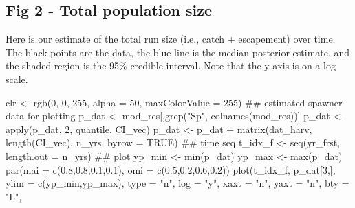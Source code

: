 \documentclass[
  11pt,
]{article}
\newenvironment{Shaded}{}{}
\newcommand{\AttributeTok}[1]{#1}
\newcommand{\ConstantTok}[1]{#1}
\newcommand{\DecValTok}[1]{#1}
\newcommand{\DocumentationTok}[1]{\textcolor[rgb]{0.00,0.50,0.00}{#1}}
\newcommand{\FloatTok}[1]{#1}
\newcommand{\FunctionTok}[1]{#1}
\newcommand{\NormalTok}[1]{#1}
\newcommand{\OtherTok}[1]{\textcolor[rgb]{1.00,0.25,0.00}{#1}}
\newcommand{\SpecialCharTok}[1]{\textcolor[rgb]{0.00,0.50,0.50}{#1}}
\newcommand{\StringTok}[1]{\textcolor[rgb]{0.00,0.50,0.50}{#1}}
\begin{document}
\hypertarget{fig-2---total-population-size}{%
\subsection{Fig 2 - Total population
size}\label{fig-2---total-population-size}}

Here is our estimate of the total run size (i.e., catch + escapement)
over time. The black points are the data, the blue line is the median
posterior estimate, and the shaded region is the 95\% credible interval.
Note that the y-axis is on a log scale.

\begin{Shaded}
\begin{Highlighting}[]
\NormalTok{clr }\OtherTok{\textless{}{-}} \FunctionTok{rgb}\NormalTok{(}\DecValTok{0}\NormalTok{, }\DecValTok{0}\NormalTok{, }\DecValTok{255}\NormalTok{, }\AttributeTok{alpha =} \DecValTok{50}\NormalTok{, }\AttributeTok{maxColorValue =} \DecValTok{255}\NormalTok{)}
\DocumentationTok{\#\# estimated spawner data for plotting}
\NormalTok{p\_dat }\OtherTok{\textless{}{-}}\NormalTok{ mod\_res[,}\FunctionTok{grep}\NormalTok{(}\StringTok{"Sp"}\NormalTok{, }\FunctionTok{colnames}\NormalTok{(mod\_res))]}
\NormalTok{p\_dat }\OtherTok{\textless{}{-}} \FunctionTok{apply}\NormalTok{(p\_dat, }\DecValTok{2}\NormalTok{, quantile, CI\_vec)}
\NormalTok{p\_dat }\OtherTok{\textless{}{-}}\NormalTok{ p\_dat }\SpecialCharTok{+} \FunctionTok{matrix}\NormalTok{(dat\_harv, }\FunctionTok{length}\NormalTok{(CI\_vec), n\_yrs, }\AttributeTok{byrow =} \ConstantTok{TRUE}\NormalTok{)}
\DocumentationTok{\#\# time seq}
\NormalTok{t\_idx\_f }\OtherTok{\textless{}{-}} \FunctionTok{seq}\NormalTok{(yr\_frst, }\AttributeTok{length.out =}\NormalTok{ n\_yrs)}
\DocumentationTok{\#\# plot}
\NormalTok{yp\_min }\OtherTok{\textless{}{-}} \FunctionTok{min}\NormalTok{(p\_dat)}
\NormalTok{yp\_max }\OtherTok{\textless{}{-}} \FunctionTok{max}\NormalTok{(p\_dat)}
\FunctionTok{par}\NormalTok{(}\AttributeTok{mai =} \FunctionTok{c}\NormalTok{(}\FloatTok{0.8}\NormalTok{,}\FloatTok{0.8}\NormalTok{,}\FloatTok{0.1}\NormalTok{,}\FloatTok{0.1}\NormalTok{), }\AttributeTok{omi =} \FunctionTok{c}\NormalTok{(}\FloatTok{0.5}\NormalTok{,}\FloatTok{0.2}\NormalTok{,}\FloatTok{0.6}\NormalTok{,}\FloatTok{0.2}\NormalTok{))}
\FunctionTok{plot}\NormalTok{(t\_idx\_f, p\_dat[}\DecValTok{3}\NormalTok{,], }\AttributeTok{ylim =} \FunctionTok{c}\NormalTok{(yp\_min,yp\_max), }\AttributeTok{type =} \StringTok{"n"}\NormalTok{,}
     \AttributeTok{log =} \StringTok{"y"}\NormalTok{, }\AttributeTok{xaxt =} \StringTok{"n"}\NormalTok{, }\AttributeTok{yaxt =} \StringTok{"n"}\NormalTok{, }\AttributeTok{bty =} \StringTok{"L"}\NormalTok{,}

\end{Highlighting}
\end{Shaded}
\end{document}
